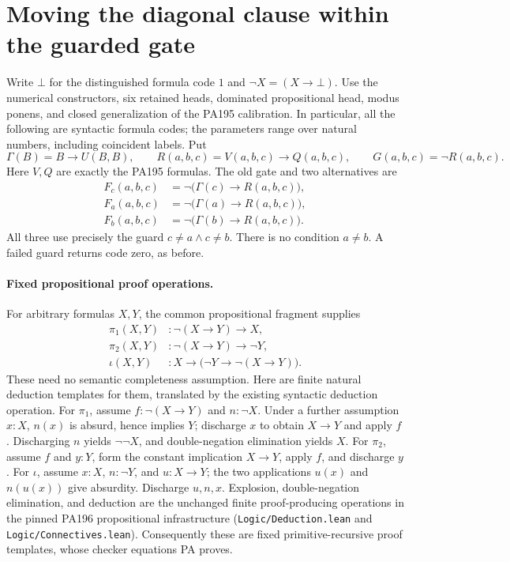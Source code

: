 \section{Moving the diagonal clause within the guarded gate}
\label{sec:gamma-relocation}
Write $\bot$ for the distinguished formula code $1$ and
$\neg X=(X\to\bot)$.  Use the numerical constructors, six retained heads,
dominated propositional head, modus ponens, and closed generalization of the
PA195 calibration.  In particular, all the following are syntactic formula
codes; the parameters range over natural numbers, including coincident labels.
Put
\[
 \Gamma(B)=B\to U(B,B),\qquad R(a,b,c)=V(a,b,c)\to Q(a,b,c),
 \qquad G(a,b,c)=\neg R(a,b,c).
\]
Here $V,Q$ are exactly the PA195 formulas.  The old gate and two alternatives
are
\begin{align*}
 F_c(a,b,c)&=\neg\bigl(\Gamma(c)\to R(a,b,c)\bigr),\\
 F_a(a,b,c)&=\neg\bigl(\Gamma(a)\to R(a,b,c)\bigr),\\
 F_b(a,b,c)&=\neg\bigl(\Gamma(b)\to R(a,b,c)\bigr).
\end{align*}
All three use precisely the guard $c\ne a\land c\ne b$.  There is no
condition $a\ne b$.  A failed guard returns code zero, as before.

\paragraph{Fixed propositional proof operations.}
For arbitrary formulas $X,Y$, the common propositional fragment supplies
\begin{align*}
 \pi_1(X,Y)&:\neg(X\to Y)\to X,\\
 \pi_2(X,Y)&:\neg(X\to Y)\to\neg Y,\\
 \iota(X,Y)&:X\to\bigl(\neg Y\to\neg(X\to Y)\bigr).
\end{align*}
These need no semantic completeness assumption.  Here are finite natural
 deduction templates for them, translated by the existing syntactic deduction
operation.  For $\pi_1$, assume $f:\neg(X\to Y)$ and $n:\neg X$.
Under a further assumption $x:X$, $n(x)$ is absurd, hence implies $Y$;
discharge $x$ to obtain $X\to Y$ and apply $f$.  Discharging $n$ yields
$\neg\neg X$, and double-negation elimination yields $X$.
For $\pi_2$, assume $f$ and $y:Y$, form the constant implication
$X\to Y$, apply $f$, and discharge $y$.
For $\iota$, assume $x:X$, $n:\neg Y$, and $u:X\to Y$; the two
applications $u(x)$ and $n(u(x))$ give absurdity.  Discharge $u,n,x$.
Explosion, double-negation elimination, and deduction are the unchanged
finite proof-producing operations in the pinned PA196 propositional
infrastructure (\texttt{Logic/Deduction.lean} and
\texttt{Logic/Connectives.lean}).  Consequently these are fixed
primitive-recursive proof templates, whose checker equations PA proves.

